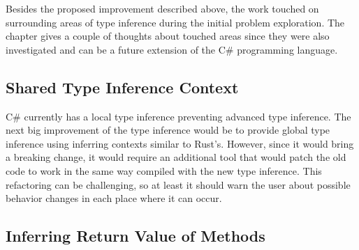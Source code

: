 Besides the proposed improvement described above, the work touched on surrounding areas of type inference during the initial problem exploration. 
The chapter gives a couple of thoughts about touched areas since they were also investigated and can be a future extension of the C\# programming language.

\subsection{Shared Type Inference Context}

C\# currently has a local type inference preventing advanced type inference. 
The next big improvement of the type inference would be to provide global type inference using inferring contexts similar to Rust's. 
However, since it would bring a breaking change, it would require an additional tool that would patch the old code to work in the same way compiled with the new type inference. 
This refactoring can be challenging, so at least it should warn the user about possible behavior changes in each place where it can occur.

\subsection{Inferring Return Value of Methods}

